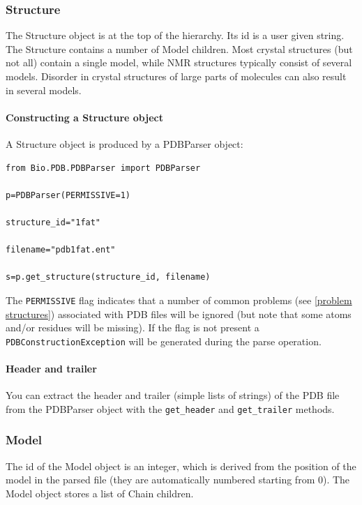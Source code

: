 \documentclass{report}
\begin{document}
\subsubsection{Structure}

The Structure object is at the top of the hierarchy. Its id is a user given
string. The Structure contains a number of Model children. Most crystal structures
(but not all) contain a single model, while NMR structures typically consist
of several models. Disorder in crystal structures of large parts of molecules
can also result in several models. 

\paragraph{Constructing a Structure object}

A Structure object is produced by a PDBParser object:

\begin{verbatim}
from Bio.PDB.PDBParser import PDBParser

p=PDBParser(PERMISSIVE=1)

structure_id="1fat"

filename="pdb1fat.ent"

s=p.get_structure(structure_id, filename)
\end{verbatim}

The {\tt PERMISSIVE} flag indicates that a number of common problems (see \ref{problem structures})
associated with PDB files will be ignored (but note that some atoms and/or residues
will be missing). If the flag is not present a {\tt PDBConstructionException}
will be generated during the parse operation.

\paragraph{Header and trailer}

You can extract the header and trailer (simple lists of strings) of the PDB
file from the PDBParser object with the {\tt get\_header} and {\tt get\_trailer}
methods.


\subsubsection{Model}

The id of the Model object is an integer, which is derived from the position
of the model in the parsed file (they are automatically numbered starting from
0). The Model object stores a list of Chain children. 
\end{document}
